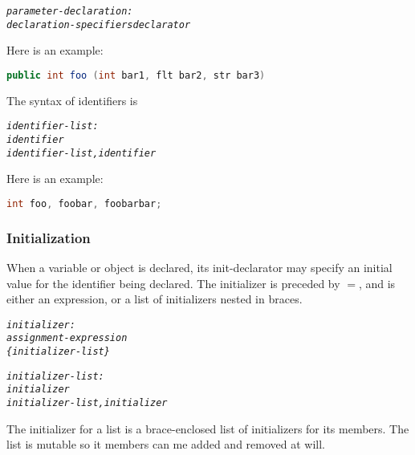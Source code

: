 \documentclass[12pt]{report}
\begin{document}
\begin{doublespace}
\begin{singlespace}
\begin{alltt}
         \textit{parameter-declaration:}
              \textit{declaration-specifiers declarator}
\end{alltt}
\end{singlespace}
Here is an example:
\begin{singlespace}
\begin{lstlisting}[language=Java,label=some-code,caption=foo declaration]
public int foo (int bar1, flt bar2, str bar3)
\end{lstlisting}
\end{singlespace}
The syntax of identifiers is
\begin{singlespace}
\begin{alltt}
         \textit{identifier-list:}
              \textit{identifier}
              \textit{identifier-list , identifier}
\end{alltt}
\end{singlespace}
Here is an example:
\begin{singlespace}
\begin{lstlisting}[language=Java,label=some-code,caption=foo declaration]
int foo, foobar, foobarbar;
\end{lstlisting}
\end{singlespace}
\end{doublespace}

\subsubsection{Initialization}
\begin{doublespace}
When a variable or object is declared, its init-declarator may specify an initial value for the identifier being declared. The initializer is preceded by $=$, and is either an expression, or a list of initializers nested in braces.
\begin{singlespace}
\begin{alltt}
         \textit{initializer:}
              \textit{assignment-expression}
              \textit{\{ initializer-list \}}
              
         \textit{initializer-list:}
              \textit{initializer}
              \textit{initializer-list , initializer}
\end{alltt}
\end{singlespace}
The initializer for a list is a brace-enclosed list of initializers for its members. The list is mutable so it members can me added and removed at will.
\end{doublespace}
\end{document}
